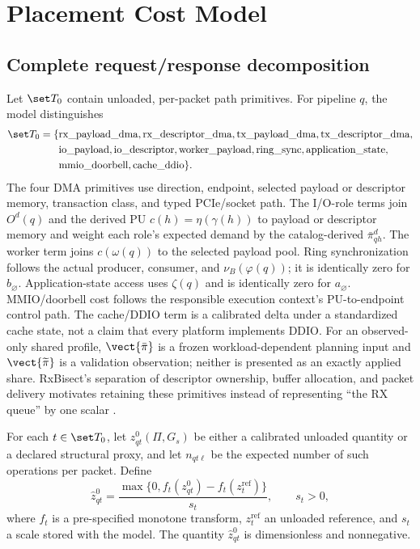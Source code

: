 \section{Placement Cost Model}
\label{sec:cost}

\subsection{Complete request/response decomposition}

Let $\set T_0$ contain unloaded, per-packet path primitives. For pipeline $q$, the model distinguishes
\begin{align*}
\set T_0=\{&\mathrm{rx\_payload\_dma},\mathrm{rx\_descriptor\_dma},
\mathrm{tx\_payload\_dma},\mathrm{tx\_descriptor\_dma},\\
&\mathrm{io\_payload},\mathrm{io\_descriptor},\mathrm{worker\_payload},
\mathrm{ring\_sync},\mathrm{application\_state},\\
&\mathrm{mmio\_doorbell},\mathrm{cache\_ddio}\}.
\end{align*}
The four DMA primitives use direction, endpoint, selected payload or descriptor memory, transaction class, and typed PCIe/socket path. The I/O-role terms join $O^d(q)$ and the derived PU $c(h)=\eta(\gamma(h))$ to payload or descriptor memory and weight each role's expected demand by the catalog-derived $\bar\pi^d_{qh}$. The worker term joins $c(\omega(q))$ to the selected payload pool. Ring synchronization follows the actual producer, consumer, and $\nu_B(\varphi(q))$; it is identically zero for $b_\varnothing$. Application-state access uses $\zeta(q)$ and is identically zero for $a_\varnothing$. MMIO/doorbell cost follows the responsible execution context's PU-to-endpoint control path. The cache/DDIO term is a calibrated delta under a standardized cache state, not a claim that every platform implements DDIO. For an observed-only shared profile, $\vect{\bar\pi}$ is a frozen workload-dependent planning input and $\vect{\widetilde\pi}$ is a validation observation; neither is presented as an exactly applied share. RxBisect's separation of descriptor ownership, buffer allocation, and packet delivery motivates retaining these primitives instead of representing ``the RX queue'' by one scalar \cite{pismenny2025rxbisect}.

For each $t\in\set T_0$, let $z^0_{qt}(\Pi,G_s)$ be either a calibrated unloaded quantity or a declared structural proxy, and let $n_{qt\ell}$ be the expected number of such operations per packet. Define
\begin{equation}
 \widehat z^0_{qt}=
 \frac{\max\{0,f_t(z^0_{qt})-f_t(z^{\mathrm{ref}}_t)\}}{s_t},
 \qquad s_t>0,
 \label{eq:primitive-normalization}
\end{equation}
where $f_t$ is a pre-specified monotone transform, $z^{\mathrm{ref}}_t$ an unloaded reference, and $s_t$ a scale stored with the model. The quantity $\widehat z^0_{qt}$ is dimensionless and nonnegative.

